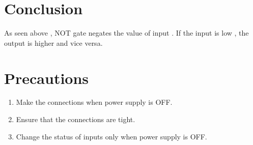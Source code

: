 \section{Conclusion}
As seen above , NOT gate negates the value of input . If the input is low , the output is higher and vice versa.

\section{Precautions}
	\begin{enumerate}
		\tightlist
		\item Make the connections when power supply is OFF.
		\item Ensure that the connections are tight.
		\item Change the status of inputs only when power supply is OFF.
	\end{enumerate}